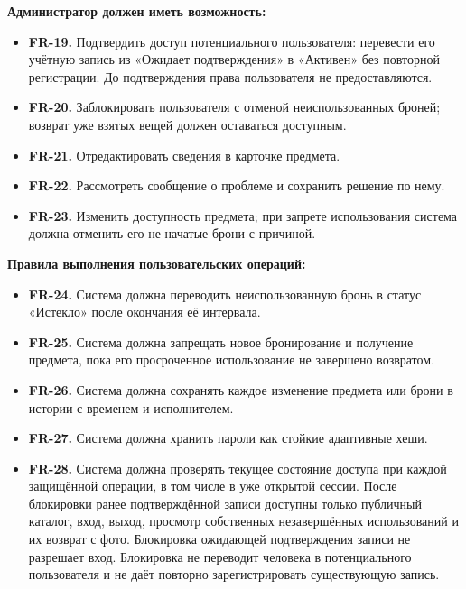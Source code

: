\documentclass[a4paper,12pt]{article}
\begin{document}
\par\noindent\textbf{Администратор должен иметь возможность:}
\begin{itemize}[itemsep=0pt]
\item \textbf{FR-19.} Подтвердить доступ потенциального пользователя: перевести его учётную запись из «Ожидает подтверждения» в «Активен» без повторной регистрации. До подтверждения права пользователя не предоставляются.
\item \textbf{FR-20.} Заблокировать пользователя с отменой неиспользованных броней; возврат уже взятых вещей должен оставаться доступным.
\item \textbf{FR-21.} Отредактировать сведения в карточке предмета.
\item \textbf{FR-22.} Рассмотреть сообщение о проблеме и сохранить решение по нему.
\item \textbf{FR-23.} Изменить доступность предмета; при запрете использования система должна отменить его не начатые брони с причиной.
\end{itemize}
\par\noindent\textbf{Правила выполнения пользовательских операций:}
\begin{itemize}[itemsep=0pt]
\item \textbf{FR-24.} Система должна переводить неиспользованную бронь в статус «Истекло» после окончания её интервала.
\item \textbf{FR-25.} Система должна запрещать новое бронирование и получение предмета, пока его просроченное использование не завершено возвратом.
\item \textbf{FR-26.} Система должна сохранять каждое изменение предмета или брони в истории с временем и исполнителем.
\item \textbf{FR-27.} Система должна хранить пароли как стойкие адаптивные хеши.
\item \textbf{FR-28.} Система должна проверять текущее состояние доступа при каждой защищённой операции, в том числе в уже открытой сессии. После блокировки ранее подтверждённой записи доступны только публичный каталог, вход, выход, просмотр собственных незавершённых использований и их возврат с фото. Блокировка ожидающей подтверждения записи не разрешает вход. Блокировка не переводит человека в потенциального пользователя и не даёт повторно зарегистрировать существующую запись.
\end{itemize}
\clearpage
{}
\end{document}

